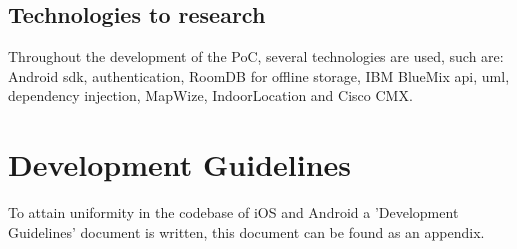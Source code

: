 \subsection{Technologies to research}
Throughout the development of the PoC, several technologies are used, such are: Android \acrshort{sdk}, authentication, RoomDB for offline storage, IBM BlueMix \acrshort{api}, \acrfull{uml}, dependency injection, MapWize, IndoorLocation and Cisco CMX.
\section{Development Guidelines}
To attain uniformity in the codebase of iOS and Android a 'Development Guidelines' document is written, this document can be found as an appendix.